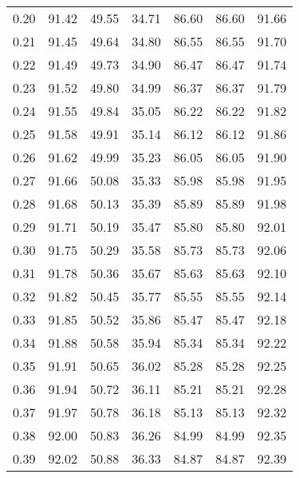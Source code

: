 \begin{tabular}{|c|c|c|c|c|c|c|}
      0.20 &     91.42 &     49.55 &      34.71 &   86.60 &      86.60 &         91.66 \\
      0.21 &     91.45 &     49.64 &      34.80 &   86.55 &      86.55 &         91.70 \\
      0.22 &     91.49 &     49.73 &      34.90 &   86.47 &      86.47 &         91.74 \\
      0.23 &     91.52 &     49.80 &      34.99 &   86.37 &      86.37 &         91.79 \\
      0.24 &     91.55 &     49.84 &      35.05 &   86.22 &      86.22 &         91.82 \\
      0.25 &     91.58 &     49.91 &      35.14 &   86.12 &      86.12 &         91.86 \\
      0.26 &     91.62 &     49.99 &      35.23 &   86.05 &      86.05 &         91.90 \\
      0.27 &     91.66 &     50.08 &      35.33 &   85.98 &      85.98 &         91.95 \\
      0.28 &     91.68 &     50.13 &      35.39 &   85.89 &      85.89 &         91.98 \\
      0.29 &     91.71 &     50.19 &      35.47 &   85.80 &      85.80 &         92.01 \\
      0.30 &     91.75 &     50.29 &      35.58 &   85.73 &      85.73 &         92.06 \\
      0.31 &     91.78 &     50.36 &      35.67 &   85.63 &      85.63 &         92.10 \\
      0.32 &     91.82 &     50.45 &      35.77 &   85.55 &      85.55 &         92.14 \\
      0.33 &     91.85 &     50.52 &      35.86 &   85.47 &      85.47 &         92.18 \\
      0.34 &     91.88 &     50.58 &      35.94 &   85.34 &      85.34 &         92.22 \\
      0.35 &     91.91 &     50.65 &      36.02 &   85.28 &      85.28 &         92.25 \\
      0.36 &     91.94 &     50.72 &      36.11 &   85.21 &      85.21 &         92.28 \\
      0.37 &     91.97 &     50.78 &      36.18 &   85.13 &      85.13 &         92.32 \\
      0.38 &     92.00 &     50.83 &      36.26 &   84.99 &      84.99 &         92.35 \\
      0.39 &     92.02 &     50.88 &      36.33 &   84.87 &      84.87 &         92.39 \\

\end{tabular}
